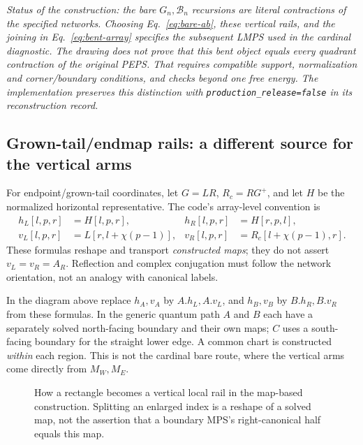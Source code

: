 \documentclass[11pt]{article}
\newcommand{\code}[1]{{\small\nolinkurl{#1}}}
\newcommand{\smallnote}[1]{\par\smallskip\noindent\textit{#1}\par\smallskip}
\begin{document}
\smallnote{Status of the construction: the bare $G_n,\mathcal B_n$ recursions
are literal contractions of the specified networks. Choosing
Eq.~\eqref{eq:bare-ab}, these vertical rails, and the joining in
Eq.~\eqref{eq:bent-array} specifies the subsequent LMPS used in the cardinal
diagnostic. The drawing does not prove that this bent object equals every
quadrant contraction of the original PEPS. That requires compatible support,
normalization and corner/boundary conditions, and checks beyond one free
energy. The implementation preserves this distinction with
\code{production_release=false} in its reconstruction record.}

\subsection{Grown-tail/endmap rails: a different source for the vertical arms}
\fi
For endpoint/grown-tail coordinates, let $G=LR$, $R_c=RG^+$, and let $H$ be
the normalized horizontal representative. The code's array-level convention is
\begin{align}
 h_L[l,p,r]&=H[l,p,r],& h_R[l,p,r]&=H[r,p,l],\\
 v_L[l,p,r]&=L[r,l+\chi(p-1)],&
 v_R[l,p,r]&=R_c[l+\chi(p-1),r].
\end{align}
These formulas reshape and transport \emph{constructed maps}; they do not
assert $v_L=v_R=A_R$. Reflection and complex conjugation must follow the
network orientation, not an analogy with canonical labels.

\ifdetailed
In the diagram above replace $h_A,v_A$ by $A.h_L,A.v_L$, and $h_B,v_B$
by $B.h_R,B.v_R$ from these formulas. In the generic quantum path $A$ and $B$
each have a separately solved north-facing boundary and their own maps;
$C$ uses a south-facing boundary for the straight lower edge. A common chart
is constructed \emph{within} each region. This is not the cardinal bare route,
where the vertical arms come directly from $M_W,M_E$.

\begin{figure}[htbp]\centering
{}
\caption{How a rectangle becomes a vertical local rail in the map-based
construction. Splitting an enlarged index is a reshape of a solved map, not
the assertion that a boundary MPS's right-canonical half equals this map.}
\end{figure}
\end{document}
